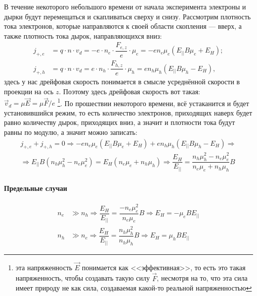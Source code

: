 В течение некоторого небольшого времени от начала эксперимента электроны и дырки будут перемещаться 
и скапливаться сверху и снизу. Рассмотрим плотность тока электронов, которые направляются к своей 
области скопления --- вверх, а также плотность тока дырок, направляющихся вниз:
\begin{align*}
  j_{+, e} &= q \cdot n \cdot v_d
    = -e \cdot n_e \cdot \dfrac{F_{e, z}}{e} \cdot \mu_e
    = -e n_e \mu_e (E_{||} B \mu_e + E_H); \\
  j_{+, h} &= q \cdot n \cdot v_d
    = e \cdot n_h \cdot \dfrac{F_{h, z}}{e} \cdot \mu_h
    = e n_h \mu_h (E_{||} B \mu_h - E_H),
\end{align*}
здесь у нас дрейфовая скорость понимается в смысле усреднённой скорости в проекции на ось $z$. 
Поэтому здесь дрейфовая скорость вот такая: $\vec{v}_d = \mu \vec{E}= \mu \vec{F} / e$
\footnote{эта напряженность $\vec{E}$ понимается как <<эффективная>>, то есть это такая
напряженность, чтобы создавать такую силу $\vec{F}$, несмотря на то, что эта сила имеет природу
не как сила, создаваемая какой-то реальной напряженностью}.
По прошествии некоторого времени, всё устаканится и будет установившийся режим, то есть количество
электронов, приходящих наверх будет равно количеству дырок, приходящих вниз, а значит и плотности
тока будут равны по модулю, а значит можно записать:
\begin{multline*}
  j_{+, e} + j_{+, h} = 0
  \Rightarrow
  -e n_e \mu_e (E_{||} B \mu_e + E_H) + e n_h \mu_h (E_{||} B \mu_h - E_H)
  \Rightarrow \\
  \Rightarrow
  E_{||} B (n_h \mu_h^2 - n_e \mu_e^2) = E_{H} (n_e \mu_e + n_h \mu_h)
  \Rightarrow
  \dfrac{E_{H}}{E_{||}} = \dfrac{n_h \mu_h^2 - n_e \mu_e^2}{n_e \mu_e + n_h \mu_h} B
\end{multline*}

\paragraph{Предельные случаи}

\begin{align*}
  n_e &\gg n_h \Rightarrow \dfrac{E_{H}}{E_{||}} = \dfrac{- n_e \mu_e^2}{n_e \mu_e} B
  \Rightarrow E_{H} = - \mu_e B E_{||} \\
  n_h &\gg n_e \Rightarrow \dfrac{E_{H}}{E_{||}} = \dfrac{n_h \mu_h^2}{n_h \mu_h} B
  \Rightarrow E_{H} = \mu_h B E_{||}
\end{align*}
